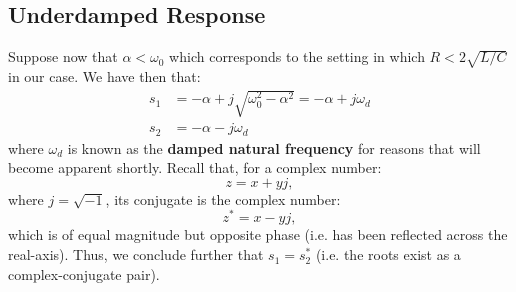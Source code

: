 \documentclass[twoside]{article}
\begin{document}
\subsection{Underdamped Response}

Suppose now that $\alpha < \omega_{0}$ which corresponds to the setting in which $R < 2\sqrt{L/C}$ in our case. We have then that:
\begin{align*}
    s_{1} &= -\alpha + j\sqrt{\omega_{0}^{2} - \alpha^{2}} = -\alpha + j \omega_{d} \\
    s_{2} &= -\alpha - j\omega_{d}
\end{align*}
where $\omega_{d}$ is known as the \textbf{damped natural frequency} for reasons that will become apparent shortly. Recall that, for a complex number:
\[
    z = x + yj,
\]
where $j = \sqrt{-1}$, its conjugate is the complex number:
\[
    z^{*} = x - yj,
\]
which is of equal magnitude but opposite phase (i.e. has been reflected across the real-axis). Thus, we conclude further that $s_{1} = s_{2}^{*}$ (i.e. the roots exist as a complex-conjugate pair).
\end{document}
